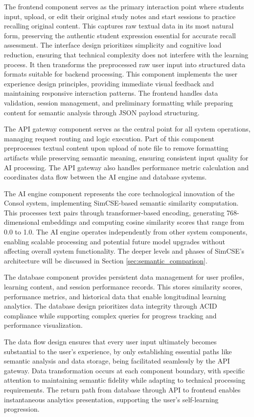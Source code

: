 {The frontend component serves as the primary interaction point where students input, upload, or edit their original study notes and start sessions to practice recalling original content. This captures raw textual data in its most natural form, preserving the authentic student expression essential for accurate recall assessment. The interface design prioritizes simplicity and cognitive load reduction, ensuring that technical complexity does not interfere with the learning process. It then transforms the preprocessed raw user input into structured data formats suitable for backend processing. This component implements the user experience design principles, providing immediate visual feedback and maintaining responsive interaction patterns. The frontend handles data validation, session management, and preliminary formatting while preparing content for semantic analysis through JSON payload structuring.

The API gateway component serves as the central point for all system operations, managing request routing and logic execution. Part of this component preprocesses textual content upon upload of note file to remove formatting artifacts while preserving semantic meaning, ensuring consistent input quality for AI processing. The API gateway also handles performance metric calculation and coordinates data flow between the AI engine and database systems.

The AI engine component represents the core technological innovation of the Consol system, implementing SimCSE-based semantic similarity computation. This processes text pairs through transformer-based encoding, generating 768-dimensional embeddings and computing cosine similarity scores that range from 0.0 to 1.0. The AI engine operates independently from other system components, enabling scalable processing and potential future model upgrades without affecting overall system functionality. The deeper levels and phases of SimCSE's architecture will be discussed in Section \ref{sec:semantic_comparison}.

The database component provides persistent data management for user profiles, learning content, and session performance records. This stores similarity scores, performance metrics, and historical data that enable longitudinal learning analytics. The database design prioritizes data integrity through ACID compliance while supporting complex queries for progress tracking and performance visualization.

The data flow design ensures that every user input ultimately becomes substantial to the user's experience, by only establishing essential paths like semantic analysis and data storage, being facilitated seamlessly by the API gateway. Data transformation occurs at each component boundary, with specific attention to maintaining semantic fidelity while adapting to technical processing requirements. The return path from database through API to frontend enables instantaneous analytics presentation, supporting the user's self-learning progression.

}
